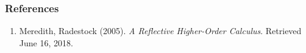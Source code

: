 \documentclass[12pt]{article}
\numberwithin{equation}{section}
\begin{document}
\subsubsection{References}
\begin{enumerate}
\item Meredith, Radestock (2005). \emph{A Reflective Higher-Order Calculus}. Retrieved June 16, 2018.
\end{enumerate}


\end{document}
